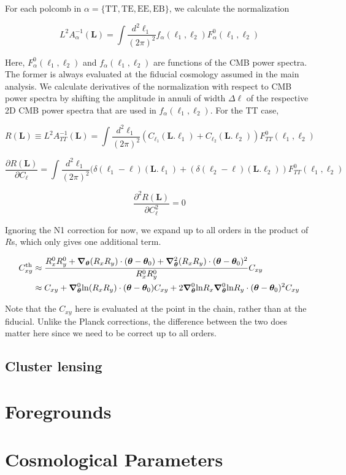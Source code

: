 \documentclass[a4paper, 11pt]{article}
\begin{document}
\newcommand{\bell}{\boldsymbol{\ell}}
\newcommand{\bL}{\boldsymbol{L}}

For each polcomb in $\alpha=\{\mathrm{TT,TE,EE,EB}\}$, we calculate the normalization

$$
L^2A_{\alpha}^{-1}(\bL) = \int \frac{d^2\bell_1}{(2\pi)^2} f_{\alpha}(\bell_1,\bell_2)F_{\alpha}^0(\bell_1,\bell_2)
$$

Here, $F_{\alpha}^0(\bell_1,\bell_2)$ and $f_{\alpha}(\bell_1,\bell_2)$ are functions of the CMB power spectra. The former is always evaluated at the fiducial cosmology assumed in the main analysis. We calculate derivatives of the normalization with respect to CMB power spectra by shifting the amplitude in annuli of width $\Delta \ell$ of the respective 2D CMB power spectra that are used in $f_{\alpha}(\bell_1,\bell_2)$. For the TT case,

$$
R(\bL) \equiv L^2A_{TT}^{-1}(\bL) = \int \frac{d^2\bell_1}{(2\pi)^2} (C_{\ell_1}(\bL.\bell_1)+C_{\ell_2}(\bL.\bell_2))F_{TT}^0(\bell_1,\bell_2)
$$

$$
\frac{\partial R(\bL)}{\partial C_{\ell}} = \int \frac{d^2\bell_1}{(2\pi)^2} (\delta(\ell_1-\ell)(\bL.\bell_1)+(\delta(\ell_2-\ell)(\bL.\bell_2))F_{TT}^0(\bell_1,\bell_2)
$$

$$
\frac{\partial^2 R(\bL)}{\partial C^2_{\ell}} = 0
$$

Ignoring the N1 correction for now, we expand up to all orders in the product of $R$s, which only gives one additional term.

\begin{align*}
C_{xy}^{\mathrm{th}}&\approx\frac{R^0_xR^0_y+\boldsymbol{\nabla}_{\boldsymbol{\theta}} (R_xR_y)\cdot (\boldsymbol{\theta}-\boldsymbol{\theta}_0)+\boldsymbol{\nabla}^2_{\boldsymbol{\theta}} (R_xR_y)\cdot (\boldsymbol{\theta}-\boldsymbol{\theta}_0)^2}{R^0_xR^0_y}C_{xy}  \\
&\approx C_{xy}+\boldsymbol{\nabla}^0_{\boldsymbol{\theta}} \mathrm{ln}(R_xR_y)\cdot (\boldsymbol{\theta}-\boldsymbol{\theta}_0)C_{xy} +2\boldsymbol{\nabla}^0_{\boldsymbol{\theta}} \mathrm{ln}R_x\boldsymbol{\nabla}^0_{\boldsymbol{\theta}}\mathrm{ln}R_y\cdot (\boldsymbol{\theta}-\boldsymbol{\theta}_0)^2C_{xy} 
\end{align*}

Note that the $C_{xy}$ here is evaluated at the point in the chain, rather than at the fiducial. Unlike the Planck corrections, the difference between the two does matter here since we need to be correct up to all orders.

\subsection{Cluster lensing}

\section{Foregrounds }


\section{Cosmological Parameters }
\end{document}
